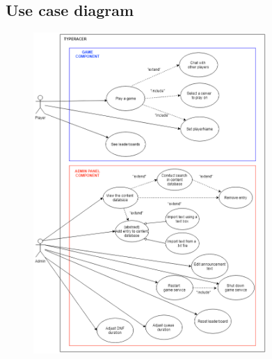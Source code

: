 \documentclass{article}
\begin{document}
\newpage
\subsection{Use case diagram}
\begin{figure}[h]
	\centering
	\includegraphics[width=0.79\textwidth]{TypeRacerUseCase.drawio.png}
\end{figure}
\newpage
\end{document}
